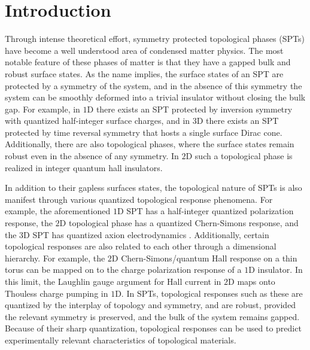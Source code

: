 \documentclass[prb,aps,twocolumn,groupaddress,floatfix]{revtex4-1}
\begin{document}
\section{Introduction}



Through intense theoretical effort, symmetry protected topological phases (SPTs) have become a well understood area of condensed matter physics\cite{hasan2010, senthil2015, kane2005, bernevig2006, kitaev2009periodic,ryu2010,hasan2011, chen2013, kapustin2015}. The most notable feature of these phases of matter is that they have a gapped bulk and robust surface states. As the name implies, the surface states of an SPT are protected by a symmetry of the system, and in the absence of this symmetry the system can be smoothly deformed into a trivial insulator without closing the bulk gap. For example, in $1$D there exists an SPT protected by inversion symmetry with quantized half-integer surface charges\cite{su1979solitons,jackiw1981solitons}, and in $3$D there exists an SPT protected by time reversal symmetry that hosts a single surface Dirac cone\cite{fu2007topological,moore2007topological}.  Additionally, there are also topological phases, where the surface states remain robust even in the absence of any symmetry. In $2$D such a topological phase is realized in integer quantum hall insulators\cite{klitzing1980}. 

In addition to their gapless surfaces states, the topological nature of SPTs is also manifest through various quantized topological response phenomena. For example, the aforementioned $1$D SPT has a half-integer quantized polarization response, the $2$D topological phase has a quantized Chern-Simons response, and the $3$D SPT has quantized axion electrodynamics \cite{king1993theory,qi2008, qi2013axion,zhang1989effective}. Additionally, certain topological responses are also related to each other through a dimensional hierarchy\cite{qi2008}. For example, the $2$D Chern-Simons/quantum Hall response on a thin torus can be mapped on to the charge polarization response of a $1$D insulator. In this limit, the Laughlin gauge argument for Hall current in $2$D\cite{laughlin1981quantized} maps onto Thouless charge pumping in $1$D\cite{thouless1983}. In SPTs, topological responses such as these are quantized by the interplay of topology and symmetry, and are robust, provided the relevant symmetry is preserved, and the bulk of the system remains gapped. Because of their sharp quantization, topological responses can be used to predict experimentally relevant characteristics of topological materials. 
\end{document}
